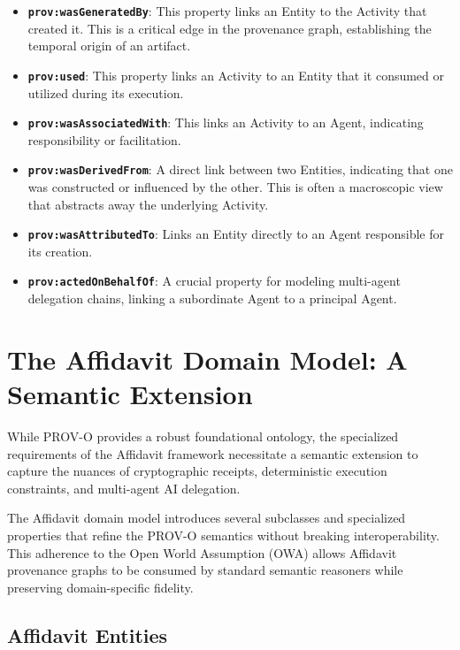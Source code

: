\begin{itemize}
    \item \textbf{\texttt{prov:wasGeneratedBy}}: This property links an Entity to the Activity that created it. This is a critical edge in the provenance graph, establishing the temporal origin of an artifact.
    \item \textbf{\texttt{prov:used}}: This property links an Activity to an Entity that it consumed or utilized during its execution.
    \item \textbf{\texttt{prov:wasAssociatedWith}}: This links an Activity to an Agent, indicating responsibility or facilitation.
    \item \textbf{\texttt{prov:wasDerivedFrom}}: A direct link between two Entities, indicating that one was constructed or influenced by the other. This is often a macroscopic view that abstracts away the underlying Activity.
    \item \textbf{\texttt{prov:wasAttributedTo}}: Links an Entity directly to an Agent responsible for its creation.
    \item \textbf{\texttt{prov:actedOnBehalfOf}}: A crucial property for modeling multi-agent delegation chains, linking a subordinate Agent to a principal Agent.
\end{itemize}

\section{The Affidavit Domain Model: A Semantic Extension}

While PROV-O provides a robust foundational ontology, the specialized requirements of the Affidavit framework necessitate a semantic extension to capture the nuances of cryptographic receipts, deterministic execution constraints, and multi-agent AI delegation.

The Affidavit domain model introduces several subclasses and specialized properties that refine the PROV-O semantics without breaking interoperability. This adherence to the Open World Assumption (OWA) allows Affidavit provenance graphs to be consumed by standard semantic reasoners while preserving domain-specific fidelity.

\subsection{Affidavit Entities}

